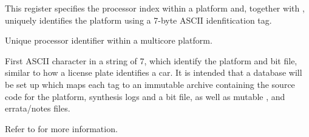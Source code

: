 

This register specifies the processor index within a platform and, together with
, uniquely identifies the platform using a 7-byte ASCII
idenfitication tag.

\reset{********}
Unique processor identifier within a multicore platform.

First ASCII character in a string of 7, which identify the platform and bit
file, similar to how a license plate identifies a car. It is intended that a
database will be set up which maps each tag to an immutable archive containing
the source code for the platform, synthesis logs and a bit file, as well as
mutable ,  and errata/notes files.



Refer to  for more information.


